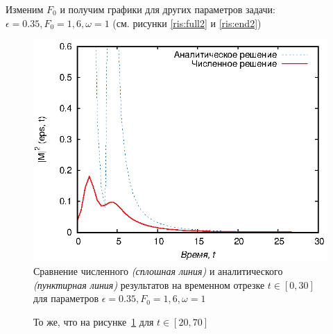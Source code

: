 \documentclass[14pt, a4paper]{article}
\numberwithin{figure}{section}
\numberwithin{equation}{section}
\begin{document}
Изменим $F_0$ и получим графики для других параметров задачи: $\epsilon = 0.35, F_0 = 1,6, \omega = 1$ (см. рисунки \ref{ris:full2} и \ref{ris:end2})

\begin{figure}[h]
	\begin{center}
		\includegraphics[width=1\linewidth]{full3}
		\caption{Сравнение численного \textit{(сплошная линия)} и аналитического \textit{(пунктирная линия)} результатов на временном отрезке $t\in[0, 30]$ для параметров $\epsilon = 0.35, F_0 = 1,6, \omega = 1$} %
		\label{ris:full3} %
	\end{center}
\end{figure}

\begin{figure}[h]
	\caption{То же, что на рисунке~\ref{ris:full3} для $t\in[20, 70]$}
	\label{ris:end3}
\end{figure}
\end{document}
